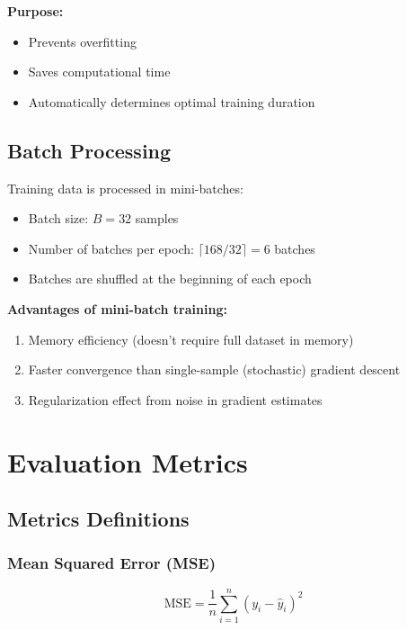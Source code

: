 \documentclass[12pt,a4paper]{article}
\begin{document}
\textbf{Purpose:}
\begin{itemize}
    \item Prevents overfitting
    \item Saves computational time
    \item Automatically determines optimal training duration
\end{itemize}

\subsection{Batch Processing}

Training data is processed in mini-batches:

\begin{itemize}
    \item Batch size: $B = 32$ samples
    \item Number of batches per epoch: $\lceil 168 / 32 \rceil = 6$ batches
    \item Batches are shuffled at the beginning of each epoch
\end{itemize}

\textbf{Advantages of mini-batch training:}
\begin{enumerate}
    \item Memory efficiency (doesn't require full dataset in memory)
    \item Faster convergence than single-sample (stochastic) gradient descent
    \item Regularization effect from noise in gradient estimates
\end{enumerate}

\section{Evaluation Metrics}

\subsection{Metrics Definitions}

\subsubsection{Mean Squared Error (MSE)}

\begin{equation}
    \text{MSE} = \frac{1}{n}\sum_{i=1}^{n}(y_i - \hat{y}_i)^2
\end{equation}
\end{document}
